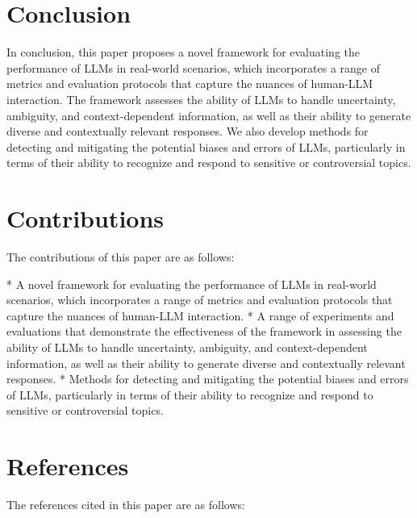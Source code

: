 \documentclass{article}
\begin{document}
\section{Conclusion}

In conclusion, this paper proposes a novel framework for evaluating the performance of LLMs in real-world scenarios, which incorporates a range of metrics and evaluation protocols that capture the nuances of human-LLM interaction. The framework assesses the ability of LLMs to handle uncertainty, ambiguity, and context-dependent information, as well as their ability to generate diverse and contextually relevant responses. We also develop methods for detecting and mitigating the potential biases and errors of LLMs, particularly in terms of their ability to recognize and respond to sensitive or controversial topics.

\section{Contributions}

The contributions of this paper are as follows:

*   A novel framework for evaluating the performance of LLMs in real-world scenarios, which incorporates a range of metrics and evaluation protocols that capture the nuances of human-LLM interaction.
*   A range of experiments and evaluations that demonstrate the effectiveness of the framework in assessing the ability of LLMs to handle uncertainty, ambiguity, and context-dependent information, as well as their ability to generate diverse and contextually relevant responses.
*   Methods for detecting and mitigating the potential biases and errors of LLMs, particularly in terms of their ability to recognize and respond to sensitive or controversial topics.

\section{References}

The references cited in this paper are as follows:
\end{document}
